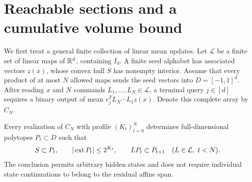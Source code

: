 \section{Reachable sections and a cumulative volume bound}
\label{sec:volume}
We first treat a general finite collection of linear mean updates.
Let $\mathcal L$ be a finite set of linear maps of $\mathbb R^d$, containing
$I_d$. A finite seed alphabet has associated vectors $z(x)$, whose
convex hull $S$ has nonempty interior. Assume that every product of at
most $N$ allowed maps sends the seed vectors into $D=[-1,1]^d$.
After reading $x$ and $N$ commands $L_1,\ldots,L_N\in\mathcal L$,
a terminal query $j\in[d]$ requires a binary output of mean
$e_j^TL_N\cdots L_1z(x)$. Denote this complete array by $C_N$.

\begin{lemma}\label{lem:lift}
Every realization of $C_N$ with profile $(K_t)_{t=0}^N$ determines
full-dimensional polytopes $P_t\subset D$ such that
\begin{equation}\label{eq:lift-conditions}
 S\subset P_t,\qquad
 |\operatorname{ext} P_t|\le2^{K_t},\qquad
 LP_t\subset P_{t+1}\quad(L\in\mathcal L,\ t<N).
\end{equation}
The conclusion permits arbitrary hidden states and does not require
individual state continuations to belong to the residual affine span.
\end{lemma}
